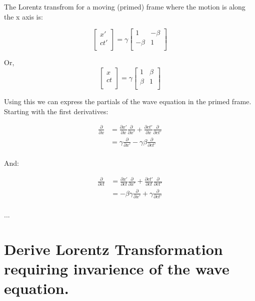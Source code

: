 \documentclass{article}      %
\begin{document}
The Lorentz transfrom for a moving (primed) frame where the motion is
along the x axis is:

\begin{equation*}
\begin{bmatrix}
x' \\
c t' \\
\end{bmatrix}
=
\gamma
\begin{bmatrix}
1 & -\beta \\
-\beta & 1 \\
\end{bmatrix}
\end{equation*}

Or,
\begin{equation*}
\begin{bmatrix}
x \\
c t \\
\end{bmatrix}
=
\gamma
\begin{bmatrix}
1 & \beta \\
\beta & 1 \\
\end{bmatrix}
\end{equation*}

Using this we can express the partials of the wave equation in the 
primed frame.  Starting with the first derivatives:

\begin{align*}
\frac{\partial}{\partial x} 
&= \frac{\partial x'}{\partial x} \frac{\partial}{\partial x'} + \frac{\partial c t'}{\partial x} \frac{\partial}{\partial c t'} \\
&= \gamma \frac{\partial}{\partial x'} - \gamma \beta \frac{\partial}{\partial c t'} \\
\end{align*}

And:

\begin{align*}
\frac{\partial}{\partial ct} 
&= \frac{\partial x'}{\partial ct} \frac{\partial}{\partial x'} + \frac{\partial c t'}{\partial ct} \frac{\partial}{\partial c t'} \\
&= -\beta \gamma \frac{\partial}{\partial x'} + \gamma \frac{\partial}{\partial c t'} \\
\end{align*}

...

\section{ Derive Lorentz Transformation requiring invarience of the wave equation. }
\end{document}
